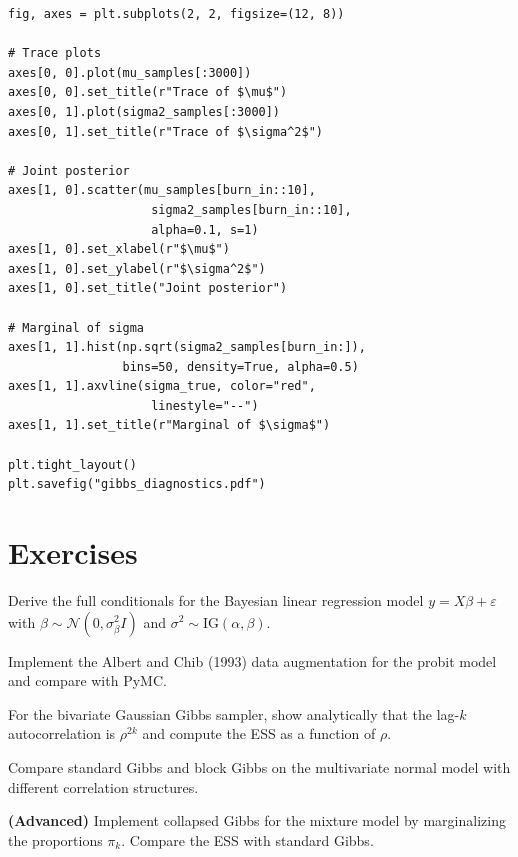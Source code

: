 \begin{codeblock}[title=\textbf{Diagnostics and visualization}]
\begin{verbatim}
fig, axes = plt.subplots(2, 2, figsize=(12, 8))

# Trace plots
axes[0, 0].plot(mu_samples[:3000])
axes[0, 0].set_title(r"Trace of $\mu$")
axes[0, 1].plot(sigma2_samples[:3000])
axes[0, 1].set_title(r"Trace of $\sigma^2$")

# Joint posterior
axes[1, 0].scatter(mu_samples[burn_in::10],
                    sigma2_samples[burn_in::10],
                    alpha=0.1, s=1)
axes[1, 0].set_xlabel(r"$\mu$")
axes[1, 0].set_ylabel(r"$\sigma^2$")
axes[1, 0].set_title("Joint posterior")

# Marginal of sigma
axes[1, 1].hist(np.sqrt(sigma2_samples[burn_in:]),
                bins=50, density=True, alpha=0.5)
axes[1, 1].axvline(sigma_true, color="red",
                    linestyle="--")
axes[1, 1].set_title(r"Marginal of $\sigma$")

plt.tight_layout()
plt.savefig("gibbs_diagnostics.pdf")
\end{verbatim}
\end{codeblock}

\section{Exercises}

\begin{exercise}
Derive the full conditionals for the Bayesian linear regression model
$y = X\beta + \varepsilon$ with $\beta \sim \mathcal{N}(0, \sigma_\beta^2 I)$
and $\sigma^2 \sim \text{IG}(\alpha, \beta)$.
\end{exercise}

\begin{exercise}
Implement the Albert and Chib (1993) data augmentation for the probit
model and compare with PyMC.
\end{exercise}

\begin{exercise}
For the bivariate Gaussian Gibbs sampler, show analytically that the
lag-$k$ autocorrelation is $\rho^{2k}$ and compute the ESS as a
function of $\rho$.
\end{exercise}

\begin{exercise}
Compare standard Gibbs and block Gibbs on the multivariate normal
model with different correlation structures.
\end{exercise}

\begin{exercise}
\textbf{(Advanced)} Implement collapsed Gibbs for the mixture model by
marginalizing the proportions $\pi_k$. Compare the ESS with standard
Gibbs.
\end{exercise}
